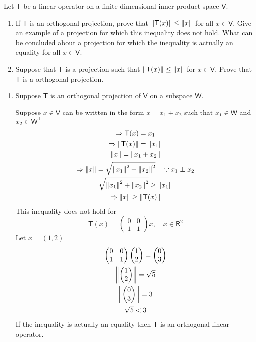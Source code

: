 Let $\mathsf{T}$ be a linear operator on a finite-dimensional inner
product space $\mathsf{V}.$
\begin{enumerate}
\item If $\mathsf{T}$ is an orthogonal projection, prove that
  $\left\lVert\mathsf{T}(x)\right\rVert \leq \left\lVert x\right\rVert$ for all $x \in \mathsf{V}.$
  Give an example of a projection for which this inequality does not
  hold. What can be concluded about a projection for which the
  inequality is actually an equality for all $x \in \mathsf{V}.$
\item Suppose that $\mathsf{T}$ is a projection such that
  $\left\lVert\mathsf{T}(x)\right\rVert \leq \left\lVert x\right\rVert$ for $x \in \mathsf{V}.$ Prove
  that $\mathsf{T}$ is a orthogonal projection.
\end{enumerate}
\begin{enumerate}
\item Suppose $\mathsf{T}$ is an orthogonal projection of $\mathsf{V}$
  on a subspace $\mathsf{W}.$ 

Suppose $x \in \mathsf{V}$ can be written in the form $x = x_1+x_2$
such that $x_1 \in \mathsf{W}$ and $x_2 \in \mathsf{W}^\perp$
\begin{gather}
\Rightarrow \mathsf{T}(x) = x_1\\
\Rightarrow \left\lVert\mathsf{T}(x)\right\rVert = \left\lVert x_1\right\rVert\\
\left\lVert x\right\rVert = \left\lVert x_1+x_2\right\rVert\\
\Rightarrow \left\lVert x\right\rVert = \sqrt{\left\lVert x_1\right\rVert^2 + \left\lVert x_2\right\rVert^2} \quad \because
x_1 \perp x_2\\
\sqrt{\left\lVert x_1\right\rVert^2 + \left\lVert x_2\right\rVert^2} \geq \left\lVert x_1\right\rVert\\
\Rightarrow \left\lVert x\right\rVert \geq \left\lVert\mathsf{T}(x)\right\rVert
\end{gather} 
This inequality does not hold for 
\begin{equation}
\mathsf{T}(x) = \begin{pmatrix}
0 & 0\\
1 & 1
\end{pmatrix}x ,\quad x \in \mathsf{R}^2
\end{equation}
Let $x = (1,2)$
\begin{gather}
\begin{pmatrix}
0 & 0\\
1 & 1 
\end{pmatrix}
\begin{pmatrix}
1\\2
\end{pmatrix}
=
\begin{pmatrix}
0\\3
\end{pmatrix}\\
\left\lVert\begin{pmatrix}
1\\2
\end{pmatrix}\right\rVert = \sqrt{5}\\
\left\lVert\begin{pmatrix}
0\\3
\end{pmatrix}\right\rVert = 3\\
\sqrt{5} < 3
\end{gather}
If the inequality is actually an equality then $\mathsf{T}$ is an
orthogonal linear operator.


\end{enumerate}
